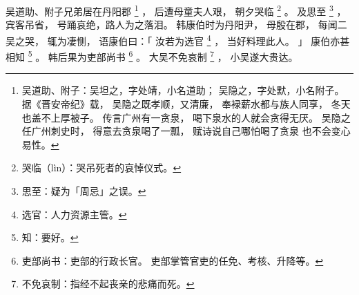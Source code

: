 
\switchcolumn*[\section{}]

吴道助、附子兄弟居在丹阳郡%
\footnote{%
    吴道助、附子：吴坦之，字处靖，小名道助；
                  吴隐之，字处默，小名附子。
                  据《晋安帝纪》载，
                  吴隐之既孝顺，又清廉，
                  奉䘵薪水都与族人同享，
                  冬天也盖不上厚被子。
                  传言广州有一贪泉，
                  喝下泉水的人就会贪得无厌。
                  吴隐之任广州刺史时，
                  得意去贪泉喝了一瓢，
                  赋诗说自己哪怕喝了贪泉
                  也不会变心易性。
}%
，
后遭母童夫人艰，
朝夕哭临%
\footnote{%
    哭临（lìn）：哭吊死者的哀悼仪式。
}%
。
及思至%
\footnote{%
    思至：疑为「周忌」之误。
}%
，
宾客吊省，
号踊哀绝，路人为之落泪。
韩康伯时为丹阳尹，
母殷在郡，
每闻二吴之哭，
辄为凄恻，
语康伯曰：「
    汝若为选官%
    \footnote{%
        选官：人力资源主管。
    }%
    ，
    当好料理此人。
」
康伯亦甚相知%
\footnote{%
    知：要好。
}%
。
韩后果为吏部尚书%
\footnote{%
    吏部尚书：吏部的行政长官。
              吏部掌管官吏的任免、考核、升降等。
}%
。
大吴不免哀制%
\footnote{%
    不免哀制：指经不起丧亲的悲痛而死。
}%
，
小吴遂大贵达。

\switchcolumn

%

